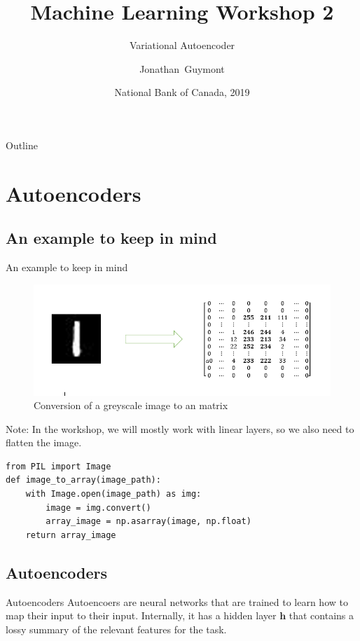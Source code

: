 \documentclass{beamer}
\title{Machine Learning Workshop 2}
\subtitle{Variational Autoencoder}
\author{Jonathan~Guymont}
\date{National Bank of Canada, 2019}
\begin{document}
\begin{frame}
	\titlepage 
\end{frame}

\begin{frame}{Outline}
	\tableofcontents
\end{frame}

\section{Autoencoders}

\subsection{An example to keep in mind}

\begin{frame}[fragile]{An example to keep in mind}
\begin{figure}
	\centering
	\includegraphics[scale=0.3]{image_to_array}
	\caption{Conversion of a greyscale image to an matrix}
\end{figure}
Note: In the workshop, we will mostly work with linear layers, so we also need to flatten the image.
\begin{verbatim}
from PIL import Image
def image_to_array(image_path):
    with Image.open(image_path) as img:
        image = img.convert()
        array_image = np.asarray(image, np.float)
    return array_image
\end{verbatim}
\end{frame}

\subsection{Autoencoders}

\begin{frame}{Autoencoders}
Autoencoers are neural networks that are trained to learn how to map their input to their input. Internally, it has a hidden layer $\bm{h}$ that contains a lossy summary of the relevant features for the task.
\end{frame}
  
\end{document}
